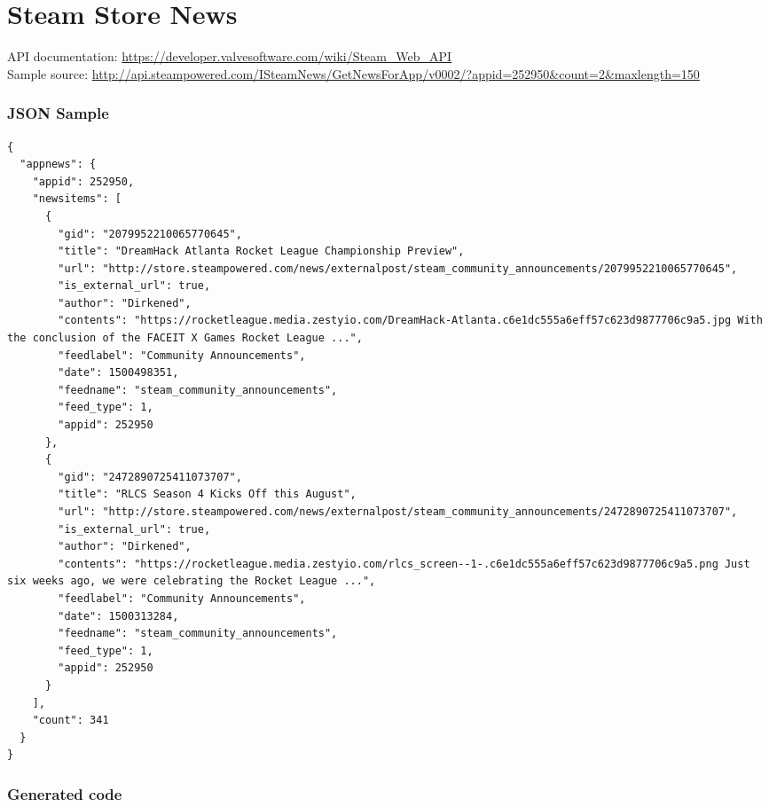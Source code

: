 \section{Steam Store News}

API documentation: \url{https://developer.valvesoftware.com/wiki/Steam_Web_API} \\
Sample source: \url{http://api.steampowered.com/ISteamNews/GetNewsForApp/v0002/?appid=252950&count=2&maxlength=150}

\subsubsection{JSON Sample}

\begin{multicols}{2}
\begin{verbatim}
{
  "appnews": {
    "appid": 252950,
    "newsitems": [
      {
        "gid": "2079952210065770645",
        "title": "DreamHack Atlanta Rocket League Championship Preview",
        "url": "http://store.steampowered.com/news/externalpost/steam_community_announcements/2079952210065770645",
        "is_external_url": true,
        "author": "Dirkened",
        "contents": "https://rocketleague.media.zestyio.com/DreamHack-Atlanta.c6e1dc555a6eff57c623d9877706c9a5.jpg With the conclusion of the FACEIT X Games Rocket League ...",
        "feedlabel": "Community Announcements",
        "date": 1500498351,
        "feedname": "steam_community_announcements",
        "feed_type": 1,
        "appid": 252950
      },
      {
        "gid": "2472890725411073707",
        "title": "RLCS Season 4 Kicks Off this August",
        "url": "http://store.steampowered.com/news/externalpost/steam_community_announcements/2472890725411073707",
        "is_external_url": true,
        "author": "Dirkened",
        "contents": "https://rocketleague.media.zestyio.com/rlcs_screen--1-.c6e1dc555a6eff57c623d9877706c9a5.png Just six weeks ago, we were celebrating the Rocket League ...",
        "feedlabel": "Community Announcements",
        "date": 1500313284,
        "feedname": "steam_community_announcements",
        "feed_type": 1,
        "appid": 252950
      }
    ],
    "count": 341
  }
}
\end{verbatim}
\end{multicols}

\subsubsection{Generated code}

